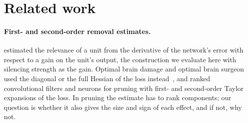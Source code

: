 \section{Related work}
\label{sec:related}

\paragraph{First- and second-order removal estimates.}
\citet{mozer1989skeletonization} estimated the relevance of a unit from the derivative of the network's error with respect to a gain on the unit's output, the construction we evaluate here with silencing strength as the gain. Optimal brain damage and optimal brain surgeon used the diagonal or the full Hessian of the loss instead~\citep{lecun1990optimal,hassibi1993second}, and \citet{molchanov2017pruning,molchanov2019importance} ranked convolutional filters and neurons for pruning with first- and second-order Taylor expansions of the loss. In pruning the estimate has to rank components; our question is whether it also gives the size and sign of each effect, and if not, why not.

